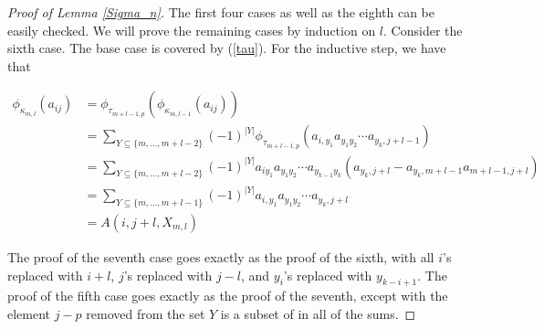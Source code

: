\documentclass{amsart}[11pt,fullpage]
\def\ltblue{blue!20!white}
\def\t{{\tau}}
\def\k{{\kappa}}
\theoremstyle{definition}
\begin{document}
\begin{proof} [Proof of Lemma \ref{Sigma_n}]\todo[color=\ltblue,inline]{check}
The first four cases  as well as the eighth can be easily checked. We will prove the remaining cases by induction on $l$. Consider the sixth case. The base case is covered by (\ref{tau}). For the inductive step, we have that

\begin{align*}
\phi_{\k_{m,l}}(a_{ij}) &= \phi_{\t_{m+l-1,p}}\left(\phi_{\k_{m,l-1}}(a_{ij})\right)\\
&= \sum_{Y\subseteq \{m,\ldots,m+l-2\}} (-1)^{|Y|} \phi_{\t_{m+l-1,p}}\left(a_{i,y_1}a_{y_1y_2}\cdots a_{y_k,j+l-1}\right)\\
&= \sum_{Y\subseteq \{m,\ldots,m+l-2\}} (-1)^{|Y|} a_{iy_1}a_{y_1y_2}\cdots a_{y_{k-1}y_k}\left(a_{y_k,j+l}-a_{y_k,m+l-1}a_{m+l-1,j+l}\right)\\
&= \sum_{Y\subseteq \{m,\ldots,m+l-1\}} (-1)^{|Y|} a_{i,y_1}a_{y_1y_2}\cdots a_{y_k,j+l}\\
&= A(i,j+l,X_{m,l})
\end{align*}

The proof of the seventh case goes exactly as the proof of the sixth, with all $i$'s replaced with $i+l$, $j$'s replaced with $j-l$, and $y_i$'s replaced with $y_{k-i+1}$. The proof of the fifth case goes exactly as the proof of the seventh, except with the element $j-p$ removed from the set $Y$ is a subset of in all of the sums.
\end{proof}






\end{document}
